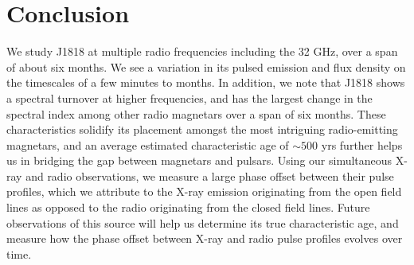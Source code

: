 \documentclass[twocolumn]{emulateapj}
\begin{document}





\section{Conclusion}
We study J1818 at multiple radio frequencies including the 32 GHz, over a span of about six months. We see a variation in its pulsed emission and flux density on the timescales of a few minutes to months. In addition, we note that J1818 shows a spectral turnover at higher frequencies, and has the largest change in the spectral index among other radio magnetars over a span of six months. These characteristics solidify its placement amongst the most intriguing radio-emitting magnetars, and an average estimated characteristic age of $\sim 500$ yrs further helps us in bridging the gap between magnetars and pulsars. Using our simultaneous X-ray and radio observations, we measure a large phase offset between their pulse profiles, which we attribute to the X-ray emission originating from the open field lines as opposed to the radio originating from the closed field lines. Future observations of this source will help us determine its true characteristic age, and measure how the phase offset between X-ray and radio pulse profiles evolves over time. %
 
\end{document}
